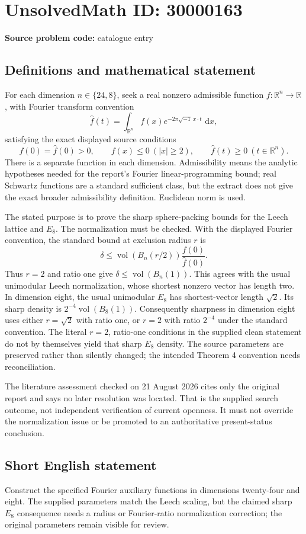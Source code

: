 \documentclass[11pt]{article}
\newcommand{\R}{\mathbb{R}}
\newcommand{\dd}{\,\mathrm{d}}
\begin{document}
\section*{UnsolvedMath ID: 30000163}
\textbf{Source problem code:} catalogue entry
\subsection{Definitions and mathematical statement}
For each dimension $n\in\{24,8\}$, seek a real nonzero admissible function $f:\R^n\to\R$, with Fourier transform convention
\[
 \widehat f(t)=\int_{\R^n}f(x)e^{-2\pi\sqrt{-1}\,x\cdot t}\,\dd x,
\]
satisfying the exact displayed source conditions
\[
 f(0)=\widehat f(0)>0,\qquad f(x)\le0\ (|x|\ge2),\qquad
 \widehat f(t)\ge0\ (t\in\R^n).
\]
There is a separate function in each dimension. Admissibility means the analytic hypotheses needed for the report's Fourier linear-programming bound; real Schwartz functions are a standard sufficient class, but the extract does not give the exact broader admissibility definition. Euclidean norm is used.

The stated purpose is to prove the sharp sphere-packing bounds for the Leech lattice and $E_8$. The normalization must be checked. With the displayed Fourier convention, the standard bound at exclusion radius $r$ is
\[
 \delta\le\operatorname{vol}(B_n(r/2))\frac{f(0)}{\widehat f(0)}.
\]
Thus $r=2$ and ratio one give $\delta\le\operatorname{vol}(B_n(1))$. This agrees with the usual unimodular Leech normalization, whose shortest nonzero vector has length two. In dimension eight, the usual unimodular $E_8$ has shortest-vector length $\sqrt2$. Its sharp density is $2^{-4}\operatorname{vol}(B_8(1))$. Consequently sharpness in dimension eight uses either $r=\sqrt2$ with ratio one, or $r=2$ with ratio $2^{-4}$ under the standard convention. The literal $r=2$, ratio-one conditions in the supplied clean statement do not by themselves yield that sharp $E_8$ density. The source parameters are preserved rather than silently changed; the intended Theorem 4 convention needs reconciliation.

The literature assessment checked on 21 August 2026 cites only the original report and says no later resolution was located. That is the supplied search outcome, not independent verification of current openness. It must not override the normalization issue or be promoted to an authoritative present-status conclusion.
\subsection{Short English statement}
Construct the specified Fourier auxiliary functions in dimensions twenty-four and eight. The supplied parameters match the Leech scaling, but the claimed sharp $E_8$ consequence needs a radius or Fourier-ratio normalization correction; the original parameters remain visible for review.
\end{document}
